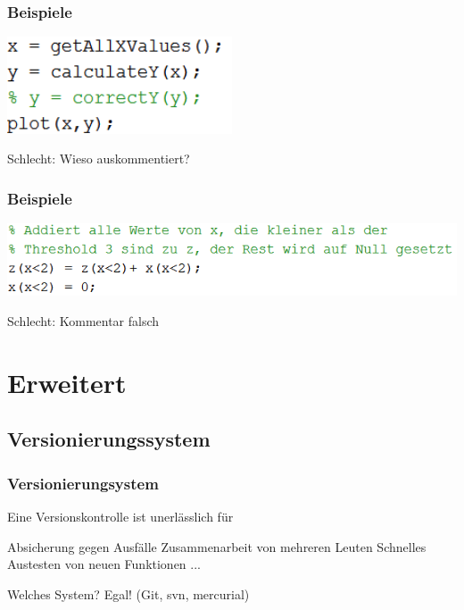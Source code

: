 \documentclass[handout]{beamer}
\begin{document}
\begin{frame}
    \frametitle{Beispiele}
        \begin{center}
    \includegraphics[width=0.5\textwidth]{pictures/Kommentare4.PNG}

    \pause
    \vspace{2em}
            \huge \color{red} Schlecht: Wieso auskommentiert?
        \end{center}
\end{frame}
\begin{frame}
    \frametitle{Beispiele}
        \begin{center}
    \includegraphics[width=\textwidth]{pictures/Kommentare5.PNG}

    \pause
    \vspace{2em}
            \huge \color{red} Schlecht: Kommentar falsch
        \end{center}
\end{frame}


\section{Erweitert}
\begin{frame}
    \tableofcontents[currentsection]
\end{frame}
\subsection{Versionierungssystem}
\begin{frame}
    \frametitle{Versionierungsystem}

    Eine Versionskontrolle ist unerlässlich für
    \begin{outline}
        \1 Absicherung gegen Ausfälle
        \1 Zusammenarbeit von mehreren Leuten
        \1 Schnelles Austesten von neuen Funktionen
        \1 ...
    \end{outline} \pause

    \vspace{2em}Welches System?\hspace{3em}
    \pause 
    Egal! (Git, svn, mercurial)

    \vspace{1em}
\end{frame}
\end{document}
